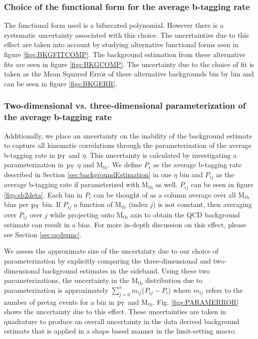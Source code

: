 \subsubsection{Choice of the functional form for the average b-tagging rate}
\label{sec:choiceoffit}
The functional form used is a bifurcated polynomial.
However there is a systematic uncertainty associated with this choice.
The uncertainties due to this effect are taken into account by
studying alternative functional forms seen in figure
\ref{figs:BKGFITCOMP}.  The background estimation from these
alternative fits are seen in figure \ref{figs:BKGCOMP}.  The
uncertainty due to the choice of fit is taken as the Mean Squared
Error of these alternative backgrounds bin by bin and can be seen in
figure \ref{figs:BKGERR}.  


\subsubsection{Two-dimensional  vs. three-dimensional parameterization of the average b-tagging rate}
\label{sec:paramerrors1}
Additionally, we place an uncertainty on the inability of the
background estimate to capture all kinematic correlations through the
parameterization of the average b-tagging rate in $\mathrm{p_{T}}$ and $\eta$.
This uncertainty is calculated by investigating a parameterization in
$\mathrm{p_{T}}$ $\eta$ and $\mathrm{M_{tb}}$.  We define $P_i$ as the average b-tagging
rate described in Section \ref{sec:backgroundEstimation} in one
$\eta$ bin and $P_{ij}$ as the average b-tagging rate if parameterized
with $\mathrm{M_{tb}}$ as well.  $P_{ij}$ can be seen in
figure \ref{figs:sb2deta}.  Each bin in $P_i$ can be thought of as a
column average over all $\mathrm{M_{tb}}$ bins per $\mathrm{p_{T}}$ bin.  If $P_{ij}$ a
function of $\mathrm{M_{tb}}$ (index $j$) is not constant, then averaging over
$P_{ij}$ over $j$ while projecting onto $\mathrm{M_{tb}}$ axis to obtain the
QCD background estimate can result in a bias.  For more in-depth
discussion on this effect, please see Section \ref{sec:qcdpunc}.

We assess the approximate size of the uncertainty due to our choice of
parameterization by explicitly comparing the three-dimensional and
two-dimensional background estimates in the sideband.  Using these two
parameterizations, the uncertainty in the $\mathrm{M_{tb}}$ distribution due to
parameterization is approximately $\displaystyle\sum\limits_{j=0}^n
m_{ij}$($P_{ij}-P_i$) where $m_{ij}$ refers to the number of pretag
events for a bin in $\mathrm{p_{T}}$ and $\mathrm{M_{tb}}$.  Fig. \ref{figs:PARAMERROR}
shows the uncertainty due to this effect. These uncertainties are
taken in quadrature to produce an overall uncertainty in the data
derived background estimate that is applied in a shape based manner in
the limit-setting macro.

